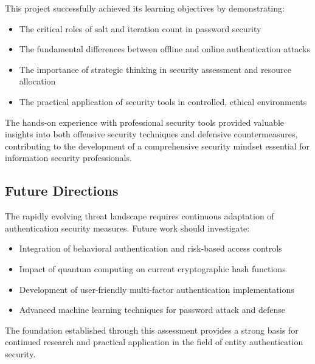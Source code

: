 This project successfully achieved its learning objectives by demonstrating:

\begin{itemize}
    \item The critical roles of salt and iteration count in password security
    \item The fundamental differences between offline and online authentication attacks
    \item The importance of strategic thinking in security assessment and resource allocation
    \item The practical application of security tools in controlled, ethical environments
\end{itemize}

The hands-on experience with professional security tools provided valuable insights into both offensive security techniques and defensive countermeasures, contributing to the development of a comprehensive security mindset essential for information security professionals.

\subsection{Future Directions}

The rapidly evolving threat landscape requires continuous adaptation of authentication security measures. Future work should investigate:

\begin{itemize}
    \item Integration of behavioral authentication and risk-based access controls
    \item Impact of quantum computing on current cryptographic hash functions
    \item Development of user-friendly multi-factor authentication implementations
    \item Advanced machine learning techniques for password attack and defense
\end{itemize}

The foundation established through this assessment provides a strong basis for continued research and practical application in the field of entity authentication security.